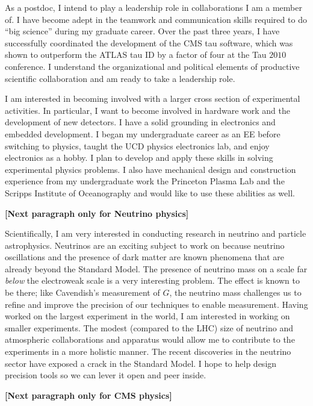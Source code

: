 \documentclass{scrartcl}        %
\begin{document}
\begin{cv}{}
As a postdoc, I intend to play a leadership role in collaborations I am a member
of.  I have become adept in the teamwork and communication skills required to do
``big science'' during my graduate career.  Over the past three years, I have
successfully coordinated the development of the CMS tau software, which was shown to
outperform the ATLAS tau ID by a factor of four at the Tau $2010$ conference.  I
understand the organizational and political elements of productive scientific
collaboration and am ready to take a leadership role.

I am interested in becoming involved with a larger cross section of experimental
activities.  In particular, I want to become involved in hardware work and the
development of new detectors. I have a solid grounding in electronics and
embedded development. I began my undergraduate career as an EE before switching
to physics, taught the UCD physics electronics lab, and enjoy electronics as a
hobby.  I plan to develop and apply these skills in solving experimental physics
problems.  I also have mechanical design and construction experience from my
undergraduate work the Princeton Plasma Lab and the Scripps Institute of
Oceanography and would like to use these abilities as well.

\textbf{[Next paragraph only for Neutrino physics]}

Scientifically, I am very interested in conducting research in neutrino and
particle astrophysics. Neutrinos are an exciting subject to work on because
neutrino oscillations and the presence of dark matter are known phenomena that
are already beyond the Standard Model.  The presence of neutrino mass on a scale
far \emph{below} the electroweak scale is a very interesting problem.  The
effect is known to be there; like Cavendish's measurement of $G$, the neutrino
mass challenges us to refine and improve the precision of our techniques to
enable measurement.  Having worked on the largest experiment in the world, I am
interested in working on smaller experiments.  The modest (compared to the LHC)
size of neutrino and atmospheric collaborations and apparatus would allow me to
contribute to the experiments in a more holistic manner.  The recent discoveries
in the neutrino sector have exposed a crack in the Standard Model. I hope to
help design precision tools so we can lever it open and peer inside.


\textbf{[Next paragraph only for CMS physics]}


\end{cv}
\end{document}
